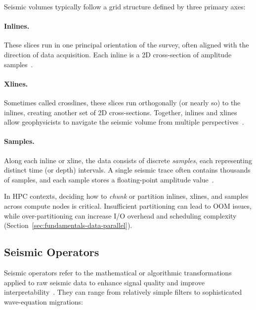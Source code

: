 Seismic volumes typically follow a grid structure defined by three primary axes:

\paragraph{Inlines.}
These slices run in one principal orientation of the survey, often aligned with the direction of data acquisition.
Each inline is a \ac{2D} cross-section of amplitude samples~\cite{Yilmaz2001}.

\paragraph{Xlines.}
Sometimes called crosslines, these slices run orthogonally (or nearly so) to the inlines, creating another set of \ac{2D} cross-sections.
Together, inlines and xlines allow geophysicists to navigate the seismic volume from multiple perspectives~\cite{Yilmaz2001}.

\paragraph{Samples.}
Along each inline or xline, the data consists of discrete \emph{samples}, each representing distinct time (or depth) intervals.
A single seismic trace often contains thousands of samples, and each sample stores a floating-point amplitude value~\cite{Yilmaz2001}.

In \ac{HPC} contexts, deciding how to \textit{chunk} or partition inlines, xlines, and samples across compute nodes is critical.
Insufficient partitioning can lead to \ac{OOM} issues, while over-partitioning can increase \ac{I/O} overhead and scheduling complexity (Section~\ref{sec:fundamentals-data-parallel}).

\subsection{Seismic Operators}
\label{subsec:fundamentals-seismic-operators}

Seismic operators refer to the mathematical or algorithmic transformations applied to raw seismic data to enhance signal quality and improve interpretability~\cite{Yilmaz2001,yilmaz-seismic-data-analysis}.
They can range from relatively simple filters to sophisticated wave-equation migrations:

